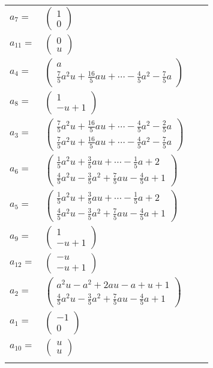 \documentclass[1p]{elsarticle_modified}
\theoremstyle{definition}
\begin{document}
\begin{tabular}{m{7pt} m{180pt} m{7pt} m{180pt} }
\flushright $a_{7}=$&$\begin{pmatrix}1\\0\end{pmatrix}$ \\
\flushright $a_{11}=$&$\begin{pmatrix}0\\u\end{pmatrix}$ \\
\flushright $a_{4}=$&$\begin{pmatrix}a\\\frac{7}{5} a^2 u+\frac{16}{5} a u+\cdots-\frac{4}{5} a^2-\frac{7}{5} a\end{pmatrix}$ \\
\flushright $a_{8}=$&$\begin{pmatrix}1\\- u+1\end{pmatrix}$ \\
\flushright $a_{3}=$&$\begin{pmatrix}\frac{7}{5} a^2 u+\frac{16}{5} a u+\cdots-\frac{4}{5} a^2-\frac{2}{5} a\\\frac{7}{5} a^2 u+\frac{16}{5} a u+\cdots-\frac{4}{5} a^2-\frac{7}{5} a\end{pmatrix}$ \\
\flushright $a_{6}=$&$\begin{pmatrix}\frac{1}{5} a^2 u+\frac{3}{5} a u+\cdots-\frac{1}{5} a+2\\\frac{4}{5} a^2 u-\frac{3}{5} a^2+\frac{7}{5} a u-\frac{4}{5} a+1\end{pmatrix}$ \\
\flushright $a_{5}=$&$\begin{pmatrix}\frac{1}{5} a^2 u+\frac{3}{5} a u+\cdots-\frac{1}{5} a+2\\\frac{4}{5} a^2 u-\frac{3}{5} a^2+\frac{7}{5} a u-\frac{4}{5} a+1\end{pmatrix}$ \\
\flushright $a_{9}=$&$\begin{pmatrix}1\\- u+1\end{pmatrix}$ \\
\flushright $a_{12}=$&$\begin{pmatrix}- u\\- u+1\end{pmatrix}$ \\
\flushright $a_{2}=$&$\begin{pmatrix}a^2 u- a^2+2 a u- a+u+1\\\frac{4}{5} a^2 u-\frac{3}{5} a^2+\frac{7}{5} a u-\frac{4}{5} a+1\end{pmatrix}$ \\
\flushright $a_{1}=$&$\begin{pmatrix}-1\\0\end{pmatrix}$ \\
\flushright $a_{10}=$&$\begin{pmatrix}u\\u\end{pmatrix}$\\&\end{tabular}
\end{document}

